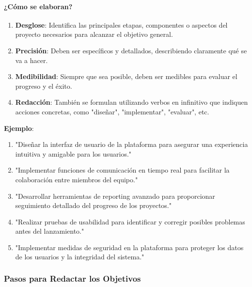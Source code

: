 \paragraph{¿Cómo se elaboran?}

\begin{enumerate}
    \item \textbf{Desglose}: Identifica las principales etapas, componentes o aspectos del proyecto necesarios para alcanzar el objetivo general.
    \item \textbf{Precisión}: Deben ser específicos y detallados, describiendo claramente qué se va a hacer.
    \item \textbf{Medibilidad}: Siempre que sea posible, deben ser medibles para evaluar el progreso y el éxito.
    \item \textbf{Redacción}: También se formulan utilizando verbos en infinitivo que indiquen acciones concretas, como "diseñar", "implementar", "evaluar", etc.
\end{enumerate}
\textbf{Ejemplo}:

\begin{enumerate}
    \item "Diseñar la interfaz de usuario de la plataforma para asegurar una experiencia intuitiva y amigable para los usuarios."
    \item "Implementar funciones de comunicación en tiempo real para facilitar la colaboración entre miembros del equipo."
    \item "Desarrollar herramientas de reporting avanzado para proporcionar seguimiento detallado del progreso de los proyectos."
    \item "Realizar pruebas de usabilidad para identificar y corregir posibles problemas antes del lanzamiento."
    \item "Implementar medidas de seguridad en la plataforma para proteger los datos de los usuarios y la integridad del sistema."
\end{enumerate}

\subsubsection{Pasos para Redactar los Objetivos}

